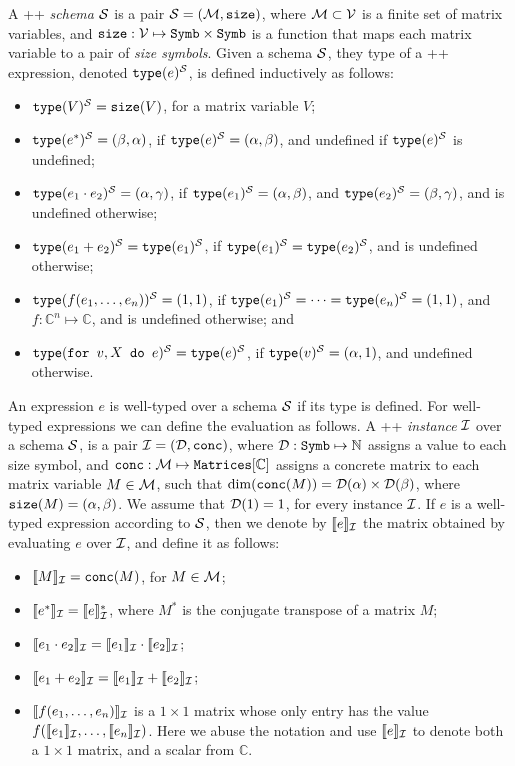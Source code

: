 A \lang++ {\em schema} $\mathcal{S}$ is a pair $\mathcal{S}=(\mathcal{M},\texttt{size})$, where $\mathcal{M}\subset \mathcal{V}$ is a finite set of matrix variables, and $\texttt{size}: \mathcal{V} \mapsto \texttt{Symb}\times \texttt{Symb}$ is a function that maps each matrix variable to a pair of {\em size symbols}. Given a schema $\mathcal{S}$, they type of a \lang++ expression, denoted $\texttt{type}(e)^{\mathcal{S}}$, is defined inductively as follows:
\begin{itemize}
\item $\texttt{type}(V)^{\mathcal{S}} = \texttt{size}(V)$, for a matrix variable $V$;
\item $\texttt{type}(e^*)^{\mathcal{S}} = (\beta,\alpha)$, if $\texttt{type}(e)^{\mathcal{S}}=(\alpha,\beta)$, and undefined if $\texttt{type}(e)^{\mathcal{S}}$ is undefined;
\item $\texttt{type}(e_1 \cdot e_2)^{\mathcal{S}} = (\alpha,\gamma)$, if $\texttt{type}(e_1)^{\mathcal{S}}=(\alpha,\beta)$, and $\texttt{type}(e_2)^{\mathcal{S}}=(\beta,\gamma)$, and is undefined otherwise;
\item $\texttt{type}(e_1 + e_2)^{\mathcal{S}} = \texttt{type}(e_1)^{\mathcal{S}}$, if $\texttt{type}(e_1)^{\mathcal{S}} = \texttt{type}(e_2)^{\mathcal{S}}$, and is undefined otherwise;
\item $\texttt{type}(f(e_1,\ldots ,e_n))^{\mathcal{S}} = (1,1)$, if $\texttt{type}(e_1)^{\mathcal{S}}= \cdots =\texttt{type}(e_n)^{\mathcal{S}}=(1,1)$, and $f:\mathbb{C}^n\mapsto \mathbb{C}$, and is undefined otherwise; and
\item $\texttt{type}(\texttt{for }v,X \texttt{ do }e)^{\mathcal{S}} = \texttt{type}(e)^{\mathcal{S}}$, if $\texttt{type}(v)^{\mathcal{S}} = (\alpha,1)$, and undefined otherwise.
\end{itemize}

An expression $e$ is well-typed over a schema $\mathcal{S}$ if its type is defined. For well-typed expressions we can define the evaluation as follows.
%
A \lang++ {\em instance} $\mathcal{I}$ over a schema $\mathcal{S}$, is a pair $\mathcal{I} = (\mathcal{D},\texttt{conc})$, where $\mathcal{D} : \texttt{Symb} \mapsto \mathbb{N}$ assigns a value to each size symbol, and $\texttt{conc} : \mathcal{M} \mapsto \texttt{Matrices}[\mathbb{C}]$ assigns a concrete matrix to each matrix variable $M\in \mathcal{M}$, such that $\dim(\texttt{conc}(M)) = \mathcal{D}(\alpha)\times \mathcal{D}(\beta)$, where $\texttt{size}(M) = (\alpha,\beta)$. We assume that $\mathcal{D}(1) = 1$, for every instance $\mathcal{I}$. If $e$ is a well-typed expression according to $\mathcal{S}$, then we denote by $\llbracket e \rrbracket_{\mathcal{I}}$ the matrix obtained by evaluating $e$ over $\mathcal{I}$, and define it as follows:
\begin{itemize}
\item $\llbracket M \rrbracket_{\mathcal{I}} = \texttt{conc}(M)$, for $M\in \mathcal{M}$;
\item $\llbracket e^* \rrbracket_{\mathcal{I}} = \llbracket e \rrbracket_{\mathcal{I}}^*$, where $M^*$ is the conjugate transpose of a matrix $M$;
\item $\llbracket e_1\cdot e_2 \rrbracket_{\mathcal{I}} = \llbracket e_1 \rrbracket_{\mathcal{I}} \cdot \llbracket e_2 \rrbracket_{\mathcal{I}}$;
\item $\llbracket e_1 + e_2 \rrbracket_{\mathcal{I}} = \llbracket e_1 \rrbracket_{\mathcal{I}} + \llbracket e_2 \rrbracket_{\mathcal{I}}$;
\item $\llbracket f(e_1,\ldots ,e_n) \rrbracket_{\mathcal{I}}$ is a $1\times 1$ matrix whose only entry has the value $f(\llbracket e_1 \rrbracket_{\mathcal{I}},\ldots ,\llbracket e_n \rrbracket_{\mathcal{I}})$. Here we abuse the notation and use $\llbracket e \rrbracket_{\mathcal{I}}$ to denote both a $1\times 1$ matrix, and a scalar from $\mathbb{C}$.
\end{itemize}

